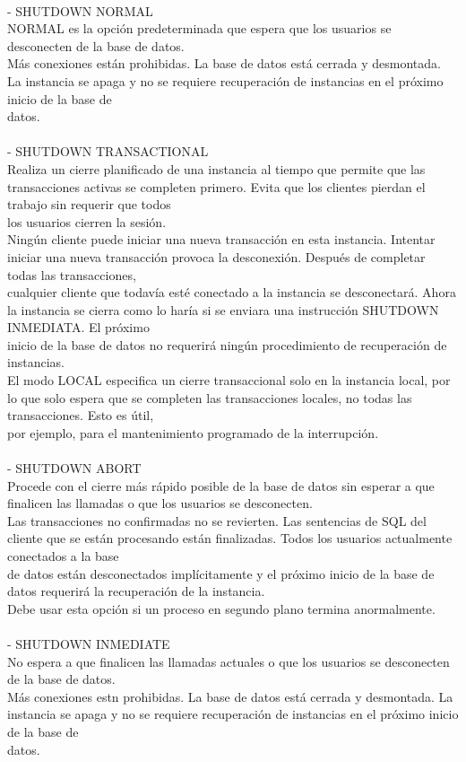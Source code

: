 \begin{enumerate}[1.]
	\\- SHUTDOWN NORMAL 
	\\NORMAL es la opci\'on predeterminada que espera que los usuarios se desconecten de la base de datos.
	\\M\'as conexiones est\'an prohibidas. La base de datos est\'a cerrada y desmontada. La instancia se apaga y no se requiere recuperaci\'on de instancias en el pr\'oximo inicio de la base de 
	\\datos.
	\\
	\\- SHUTDOWN TRANSACTIONAL 
	\\Realiza un cierre planificado de una instancia al tiempo que permite que las transacciones activas se completen primero. Evita que los clientes pierdan el trabajo sin requerir que todos 
	\\los usuarios cierren la sesi\'on.
	\\Ning\'un cliente puede iniciar una nueva transacci\'on en esta instancia. Intentar iniciar una nueva transacci\'on provoca la desconexi\'on. Despu\'es de completar todas las transacciones, 
	\\cualquier cliente que todav\'ia est\'e conectado a la instancia se desconectar\'a. Ahora la instancia se cierra como lo har\'ia si se enviara una instrucción SHUTDOWN INMEDIATA. El pr\'oximo 
	\\inicio de la base de datos no requerir\'a ningún procedimiento de recuperación de instancias.
	\\El modo LOCAL especifica un cierre transaccional solo en la instancia local, por lo que solo espera que se completen las transacciones locales, no todas las transacciones. Esto es \'util, 
	\\por ejemplo, para el mantenimiento programado de la interrupci\'on.
	\\
	\\- SHUTDOWN ABORT 
	\\Procede con el cierre m\'as r\'apido posible de la base de datos sin esperar a que finalicen las llamadas o que los usuarios se desconecten.
	\\Las transacciones no confirmadas no se revierten. Las sentencias de SQL del cliente que se est\'an procesando est\'an finalizadas. Todos los usuarios actualmente conectados a la base 
	\\de datos est\'an desconectados impl\'icitamente y el pr\'oximo inicio de la base de datos requerir\'a la recuperaci\'on de la instancia.
	\\Debe usar esta opci\'on si un proceso en segundo plano termina anormalmente.
	\\
	\\- SHUTDOWN INMEDIATE
	\\No espera a que finalicen las llamadas actuales o que los usuarios se desconecten de la base de datos.
	\\M\'as conexiones estn prohibidas. La base de datos est\'a cerrada y desmontada. La instancia se apaga y no se requiere recuperaci\'on de instancias en el pr\'oximo inicio de la base de 
	\\datos.


\end{enumerate}
